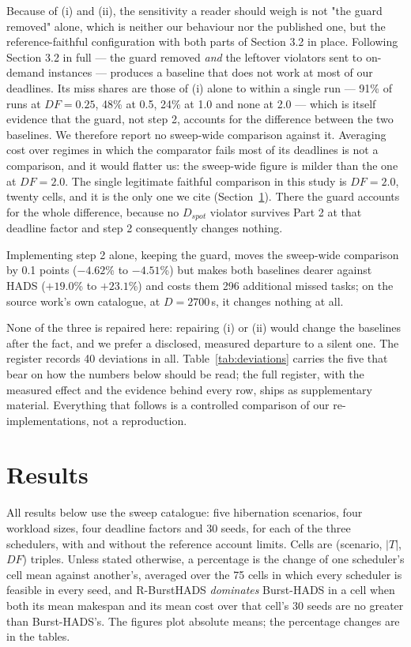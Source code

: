 \documentclass[conference]{IEEEtran}
\begin{document}
Because of (i) and (ii), the sensitivity a reader should weigh is not "the
guard removed" alone, which is neither our behaviour nor the published one, but
the reference-faithful configuration with both parts of Section 3.2 in place.
Following Section 3.2 in full --- the guard removed \emph{and} the leftover
violators sent to on-demand instances --- produces a baseline that does not
work at most of our deadlines. Its miss shares are those of (i) alone to within
a single run --- 91\% of runs at $\mathit{DF} = 0.25$, 48\% at 0.5, 24\% at 1.0
and none at 2.0 --- which is itself evidence that the guard, not step 2, accounts
for the difference between the two baselines. We therefore report no
sweep-wide comparison against it. Averaging cost over regimes in which the
comparator fails most of its deadlines is not a comparison, and it would
flatter us: the sweep-wide figure is milder than the one at
$\mathit{DF} = 2.0$. The single legitimate faithful comparison in this study
is $\mathit{DF} = 2.0$, twenty cells, and it is the only one we cite
(Section~\ref{sec:results}). There the guard accounts for the whole
difference, because no $D_{\mathit{spot}}$ violator survives Part 2 at that
deadline factor and step 2 consequently changes nothing.

Implementing step 2 alone, keeping the guard, moves the sweep-wide comparison
by 0.1 points ($-4.62$\% to $-4.51$\%) but makes both baselines dearer against
HADS ($+19.0$\% to $+23.1$\%) and costs them 296 additional missed tasks; on
the source work's own catalogue, at $D = 2700$\,s, it changes nothing at
all.

None of the three is repaired here: repairing (i) or (ii) would change the
baselines after the fact, and we prefer a disclosed, measured departure to a
silent one. The register records 40 deviations in all. Table~\ref{tab:deviations}
carries the five that bear on how the numbers below should be read; the full
register, with the measured effect and the evidence behind every row, ships as
supplementary material. Everything that follows is a controlled
comparison of our re-implementations, not a reproduction.

\section{Results}
\label{sec:results}

All results below use the sweep catalogue: five hibernation scenarios, four
workload sizes, four deadline factors and 30 seeds, for each of the three
schedulers, with and without the reference account limits. Cells are
(scenario, $|T|$, $\mathit{DF}$) triples. Unless stated otherwise, a
percentage is the change of one scheduler's cell mean against another's,
averaged over the 75 cells in which every scheduler is feasible in every seed,
and R-BurstHADS \emph{dominates} Burst-HADS in a cell when both its mean
makespan and its mean cost over that cell's 30 seeds are no greater than
Burst-HADS's. The figures plot absolute means; the percentage changes are in
the tables.
\end{document}
